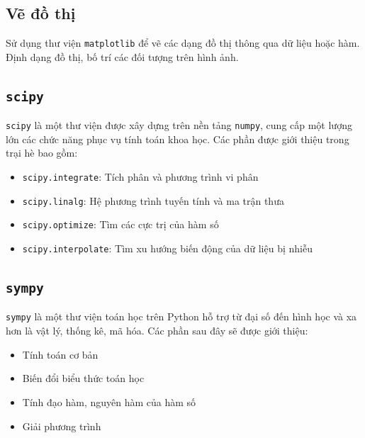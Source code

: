 \documentclass[12pt, a4paper, twoside]{article}
\begin{document}
\subsection{Vẽ đồ thị}
Sử dụng thư viện \texttt{matplotlib} để vẽ các dạng đồ thị thông qua dữ liệu hoặc hàm. Định dạng đồ thị, bố trí các đối tượng trên hình ảnh.
\subsection{\texttt{scipy}}
\texttt{scipy} là một thư viện được xây dựng trên nền tảng \texttt{numpy}, cung cấp một lượng lớn các chức năng phục vụ tính toán khoa học. Các phần được giới thiệu trong trại hè bao gồm:
\begin{itemize}
    \item \texttt{scipy.integrate}: Tích phân và phương trình vi phân
    \item \texttt{scipy.linalg}: Hệ phương trình tuyến tính và ma trận thưa
    \item \texttt{scipy.optimize}: Tìm các cực trị của hàm số
    \item \texttt{scipy.interpolate}: Tìm xu hướng biến động của dữ liệu bị nhiễu
\end{itemize}
\subsection{\texttt{sympy}}
\texttt{sympy} là một thư viện toán học trên Python hỗ trợ từ đại số đến hình học và xa hơn là vật lý, thống kê, mã hóa. Các phần sau đây sẽ được giới thiệu:
\begin{itemize}
    \item Tính toán cơ bản
    \item Biến đổi biểu thức toán học
    \item Tính đạo hàm, nguyên hàm của hàm số
    \item Giải phương trình
\end{itemize}
\end{document}
